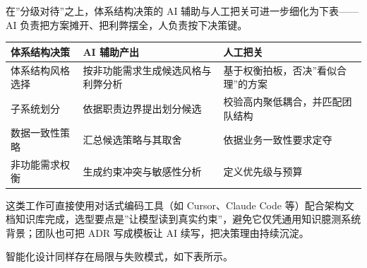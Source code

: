 \documentclass[
]{ctexbook}
\newcounter{none}
\begin{document}
在''分级对待''之上，体系结构决策的 AI
辅助与人工把关可进一步细化为下表------AI
负责把方案摊开、把利弊摆全，人负责按下决策键。

{\def\LTcaptype{none} %
\begin{longtable}[]{@{}
  >{\raggedright\arraybackslash}p{}
  >{\raggedright\arraybackslash}p{}
  >{\raggedright\arraybackslash}p{}@{}}
\toprule\noalign{}
\begin{minipage}[b]{\linewidth}\raggedright
体系结构决策
\end{minipage} & \begin{minipage}[b]{\linewidth}\raggedright
AI 辅助产出
\end{minipage} & \begin{minipage}[b]{\linewidth}\raggedright
人工把关
\end{minipage} \\
\midrule\noalign{}
\endhead
\bottomrule\noalign{}
\endlastfoot
体系结构风格选择 & 按非功能需求生成候选风格与利弊分析 &
基于权衡拍板，否决''看似合理''的方案 \\
子系统划分 & 依据职责边界提出划分候选 &
校验高内聚低耦合，并匹配团队结构 \\
数据一致性策略 & 汇总候选策略与其取舍 & 依据业务一致性要求定夺 \\
非功能需求权衡 & 生成约束冲突与敏感性分析 & 定义优先级与预算 \\
\end{longtable}
}

这类工作可直接使用对话式编码工具（如 Cursor、Claude Code
等）配合架构文档知识库完成，选型要点是''让模型读到真实约束''，避免它仅凭通用知识臆测系统背景；团队也可把
ADR 写成模板让 AI 续写，把决策理由持续沉淀。

智能化设计同样存在局限与失败模式，如下表所示。
\end{document}
